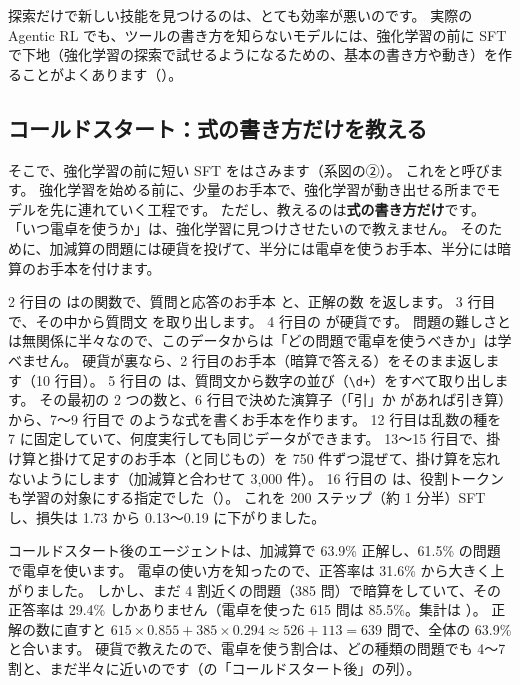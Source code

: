 探索だけで新しい技能を見つけるのは、とても効率が悪いのです。
実際の Agentic RL でも、ツールの書き方を知らないモデルには、強化学習の前に SFT で下地（強化学習の探索で試せるようになるための、基本の書き方や動き）を作ることがよくあります（）。

\subsection{コールドスタート：式の書き方だけを教える}

そこで、強化学習の前に短い SFT をはさみます（系図の②）。
これをと呼びます。
強化学習を始める前に、少量のお手本で、強化学習が動き出せる所までモデルを先に連れていく工程です。
ただし、教えるのは\textbf{式の書き方だけ}です。
「いつ電卓を使うか」は、強化学習に見つけさせたいので教えません。
そのために、加減算の問題には硬貨を投げて、半分には電卓を使うお手本、半分には暗算のお手本を付けます。


2 行目の  はの関数で、質問と応答のお手本  と、正解の数  を返します。
3 行目で、その中から質問文  を取り出します。
4 行目の  が硬貨です。
問題の難しさとは無関係に半々なので、このデータからは「どの問題で電卓を使うべきか」は学べません。
硬貨が裏なら、2 行目のお手本（暗算で答える）をそのまま返します（10 行目）。
5 行目の  は、質問文から数字の並び（\texttt{\textbackslash d+}）をすべて取り出します。
その最初の 2 つの数と、6 行目で決めた演算子（「引」か \code{-} があれば引き算）から、7〜9 行目で  のような式を書くお手本を作ります。
12 行目は乱数の種を 7 に固定していて、何度実行しても同じデータができます。
13〜15 行目で、掛け算と掛けて足すのお手本（と同じもの）を 750 件ずつ混ぜて、掛け算を忘れないようにします（加減算と合わせて 3,000 件）。
16 行目の  は、役割トークンも学習の対象にする指定でした（）。
これを 200 ステップ（約 1 分半）SFT し、損失は 1.73 から 0.13〜0.19 に下がりました。

コールドスタート後のエージェントは、加減算で 63.9\% 正解し、61.5\% の問題で電卓を使います。
電卓の使い方を知ったので、正答率は 31.6\% から大きく上がりました。
しかし、まだ 4 割近くの問題（385 問）で暗算をしていて、その正答率は 29.4\% しかありません（電卓を使った 615 問は 85.5\%。集計は ）。
正解の数に直すと $615\times0.855+385\times0.294\approx526+113=639$ 問で、全体の 63.9\% と合います。
硬貨で教えたので、電卓を使う割合は、どの種類の問題でも 4〜7 割と、まだ半々に近いのです（の「コールドスタート後」の列）。

